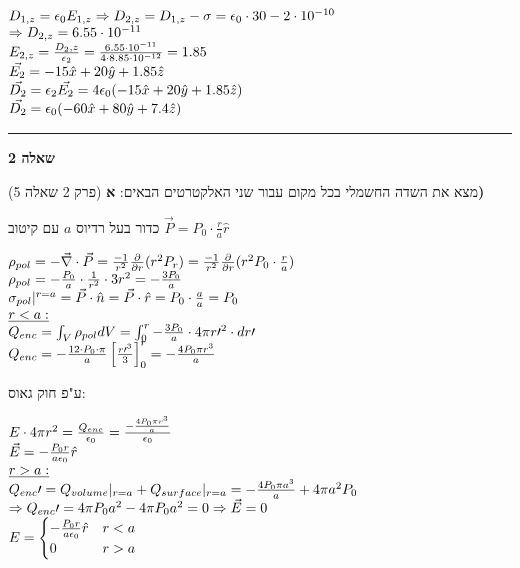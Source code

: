 \documentclass[14pt]{extarticle}
\makeatletter
\newenvironment{lefteqs}{%
    \begin{english}%
    \begin{flushleft}%
    \renewcommand{\arraystretch}{1.3}%
    $\begin{array}{@{}l@{}}%
}{%
    \end{array}$%
    \end{flushleft}%
    \end{english}%
}
\makeatother
\begin{document}
\begin{lefteqs}
    D_{1,z} = \epsilon_0 E_{1,z} \Rightarrow D_{2,z} = D_{1,z} - \sigma = \epsilon_0 \cdot 30 - 2 \cdot 10^{-10} \\
    \Rightarrow D_{2,z} = 6.55 \cdot 10^{-11} \\
    E_{2,z} = \frac{D_2,z}{\epsilon_2} = \frac{6.55 \cdot 10^{-11}}{4 \cdot 8.85 \cdot 10^{-12}} = 1.85 \\
    \vec{E_2} = -15\hat{x} + 20\hat{y} + 1.85\hat{z} \\
    \vec{D_2} = \epsilon_2 \vec{E_2} = 4\epsilon_0(-15\hat{x} + 20\hat{y} + 1.85\hat{z}) \\
    \vec{D_2} = \epsilon_0(-60\hat{x} + 80\hat{y} + 7.4\hat{z})
\end{lefteqs}

\vspace{3em}
\hrule
\vspace{2em}

\textbf{\large שאלה 2}

(פרק 2 שאלה 5)
מצא את השדה החשמלי בכל מקום עבור שני האלקטרטים הבאים:
\textbf{א)} 

כדור בעל רדיוס $a$ עם קיטוב $\vec{P} = P_0 \cdot \frac{r}{a} \hat{r}$

\begin{lefteqs}
    \rho_{pol} = -\vec{\nabla} \cdot \vec{P} = \frac{-1}{r^2} \frac{\partial}{\partial r} (r^2 P_r) = \frac{-1}{r^2} \frac{\partial}{\partial r} (r^2 P_0 \cdot \frac{r}{a}) \\
    \rho_{pol} = -\frac{P_0}{a} \cdot \frac{1}{r^2} \cdot 3r^2 = -\frac{3P_0}{a} \\
    \sigma_{pol} |^{r=a} = \vec{P} \cdot \hat{n} = \vec{P} \cdot \hat{r} = P_0 \cdot \frac{a}{a} = P_0 \\
    \underline{r<a:} \\
    Q_{enc} = \int_V \rho_{pol} dV = \int_0^r -\frac{3P_0}{a} \cdot 4\pi r\prime^2 \cdot dr\prime \\
    Q_{enc} = -\frac{12 \cdot P_0 \cdot \pi}{a} \left[ \frac{r\prime^3}{3} \right]_0^r = -\frac{4P_0\pi r^3}{a} \\
\end{lefteqs}

ע"פ חוק גאוס:

\begin{lefteqs}
    E \cdot 4\pi r^2 = \frac{Q_{enc}}{\epsilon_0} = \frac{-\frac{4P_0\pi r^3}{a}}{\epsilon_0} \\
    \vec{E} = -\frac{P_0 r}{a \epsilon_0} \hat{r} \\
    \underline{r>a:} \\
    Q_{enc}\prime = Q_{volume}|_{r=a} + Q_{surface}|_{r=a} = -\frac{4P_0\pi a^3}{a} + 4\pi a^2 P_0 \\
    \Rightarrow Q_{enc}\prime = 4\pi P_0 a^2 - 4\pi P_0 a^2 = 0 \Rightarrow \vec{E} = 0 \\
    E = \begin{cases}
    -\frac{P_0 r}{a \epsilon_0} \hat{r} & r < a \\
    0 & r > a
    \end{cases}
\end{lefteqs}
\end{document}
